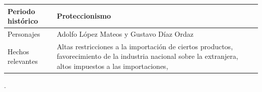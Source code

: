 \documentclass[12pt]{article}
\begin{document}
	\begin{longtable}[]{@{}ll@{}}

		\begin{minipage}[b]{0.54\columnwidth}\raggedright
			Periodo histórico\strut
		\end{minipage} & 
			\begin{minipage}[b]{0.40\columnwidth}\raggedright
				Proteccionismo\strut
			\end{minipage}\tabularnewline

	\endhead

		\begin{minipage}[t]{0.54\columnwidth}\raggedright
			Personajes\strut
		\end{minipage} & 
			\begin{minipage}[t]{0.40\columnwidth}\raggedright
				Adolfo López Mateos y Gustavo Díaz Ordaz\strut
		\end{minipage}\tabularnewline
	
		\begin{minipage}[t]{0.54\columnwidth}\raggedright
				Hechos relevantes\strut
		\end{minipage} & 
			\begin{minipage}[t]{0.40\columnwidth}\raggedright
				Altas restricciones a la importación de ciertos productos, favorecimiento de la industria nacional sobre la extranjera, altos impuestos a las importaciones,\strut
		\end{minipage}\tabularnewline

	\end{longtable}.\dotfill
	
\end{document}
